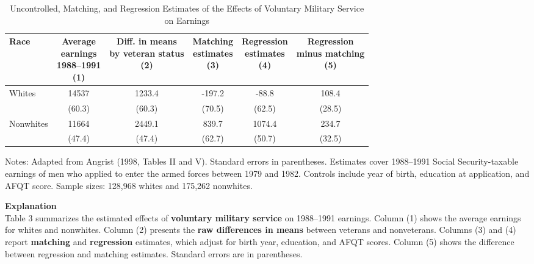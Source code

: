 \documentclass[12pt]{article}
\begin{document}
\begin{table}[H]
\centering
\caption{Uncontrolled, Matching, and Regression Estimates of the Effects of Voluntary Military Service on Earnings}
\scriptsize
\begin{tabular}{lccccc}
\hline
Race & \shortstack{Average \\ earnings \\ 1988--1991 \\ (1)} 
     & \shortstack{Diff. in means \\ by veteran status \\ (2)} 
     & \shortstack{Matching \\ estimates \\ (3)} 
     & \shortstack{Regression \\ estimates \\ (4)} 
     & \shortstack{Regression \\ minus matching \\ (5)} \\
\hline
Whites    & 14537 & 1233.4  & -197.2  & -88.8   & 108.4 \\
          & (60.3) & (60.3) & (70.5)  & (62.5)  & (28.5) \\
Nonwhites & 11664 & 2449.1  & 839.7   & 1074.4  & 234.7 \\
          & (47.4) & (47.4) & (62.7)  & (50.7)  & (32.5) \\
\hline
\end{tabular}

\begin{flushleft}
\footnotesize 
Notes: Adapted from Angrist (1998, Tables II and V). Standard errors in parentheses.  
Estimates cover 1988--1991 Social Security-taxable earnings of men who applied to enter the armed forces between 1979 and 1982.  
Controls include year of birth, education at application, and AFQT score.  
Sample sizes: 128,968 whites and 175,262 nonwhites.  
\end{flushleft}
\end{table}

\doublespacing
\textbf{Explanation} \\
Table 3 summarizes the estimated effects of \textbf{voluntary military service} 
on 1988--1991 earnings. Column (1) shows the average earnings for whites and nonwhites.  
Column (2) presents the \textbf{raw differences in means} between veterans and nonveterans.  
Columns (3) and (4) report \textbf{matching} and \textbf{regression} estimates, 
which adjust for birth year, education, and AFQT scores.  
Column (5) shows the difference between regression and matching estimates.  
Standard errors are in parentheses.  
\end{document}
